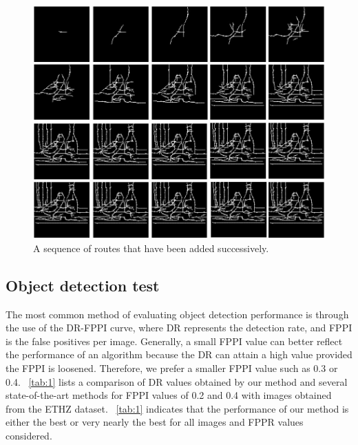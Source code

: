 \documentclass[journal]{IEEEtran}
\begin{document}
\begin{figure}[!t]
\centering
\includegraphics[width=0.95\linewidth]{images/fig20.jpg}
\caption{A sequence of routes that have been added successively.}
\label{fig:20}
\end{figure}

\subsection{Object detection test}

The most common method of evaluating object detection performance is through the use of the DR-FPPI curve, 
where DR represents the detection rate, and FPPI is the false positives per image. 
Generally, a small FPPI value can better reflect the performance of an algorithm because the DR can attain a high value provided the FPPI is loosened. 
Therefore, we prefer a smaller FPPI value such as 0.3 or 0.4. 
\tablename~\ref{tab:1} lists a comparison of DR values obtained by our method and several state-of-the-art methods 
\cite{ferrari2010,ferrari2008} for FPPI values of 0.2 and 0.4 with images obtained from the ETHZ dataset. 
\tablename~\ref{tab:1} indicates that the performance of our method is either the best or very nearly the best for all images and FPPR values considered.
 
\end{document}
